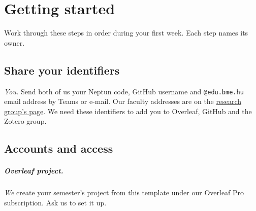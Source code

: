 \chapter{Getting started}\label{app:start}
Work through these steps in order during your first week. Each step names its owner.

\section{Share your identifiers}\label{app:start:ids}
\emph{You.} Send both of us your Neptun code, GitHub username and \texttt{@edu.bme.hu} email address by Teams or e-mail. Our faculty addresses are on the \href{https://ftsrg.mit.bme.hu/en/about/}{research group's page}. We need these identifiers to add you to Overleaf, GitHub and the Zotero group.

\section{Accounts and access}\label{app:start:access}
\paragraph{Overleaf project.} \emph{We} create your semester's project from this template under our Overleaf Pro subscription. Ask us to set it up.

